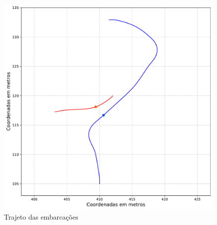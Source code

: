         \begin{figure}[H]
            \centering
            \includegraphics[scale=0.45]{fig/chap5/crossing_right_trajectory.pdf}
            \caption{Trajeto das embarcações}
            \label{fig:chap5_crossing_right_paths}
        \end{figure}
        
